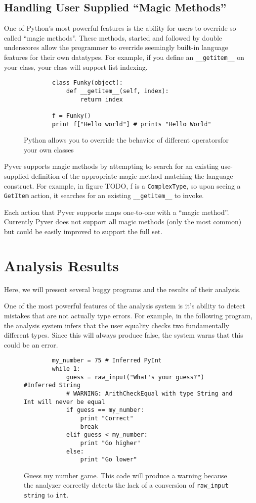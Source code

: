 \documentclass{article}[12pt]
\begin{document}
\subsection{Handling User Supplied ``Magic Methods''}
One of Python's most powerful features is the ability for users to override so called ``magic methods''. These methods,
started and followed by double underscores allow the programmer to override seemingly built-in language features for
their own datatypes. For example, if you define an \texttt{\_\_getitem\_\_} on your class, your class will support list
indexing.
\begin{figure}
    \begin{verbatim}
        class Funky(object):
            def __getitem__(self, index):
                return index

        f = Funky()
        print f["Hello world"] # prints "Hello World"
    \end{verbatim}
    \caption{Python allows you to override the behavior of different operatorsfor your own classes}
\end{figure}

Pyver supports magic methods by attempting to search for an existing use-supplied definition of the appropriate magic
method matching the language construct. For example, in figure TODO, f is a \texttt{ComplexType}, so upon seeing a
\texttt{GetItem} action, it searches for an existing \texttt{\_\_getitem\_\_} to invoke.
  
Each action that Pyver supports maps one-to-one with a ``magic method''. Currently Pyver does not support all magic
methods (only the most common) but could be easily improved to support the full set.

\section{Analysis Results}

Here, we will present several buggy programs and the results of their analysis.

One of the most powerful features of the analysis system is it's ability to detect mistakes that are
not actually type errors. For example, in the following program, the analysis system infers that the
user equality checks two fundamentally different types. Since this will always produce false, the
system warns that this could be an error.

\begin{figure}
    \begin{verbatim}
        my_number = 75 # Inferred PyInt
        while 1:
            guess = raw_input("What's your guess?") #Inferred String
            # WARNING: ArithCheckEqual with type String and Int will never be equal 
            if guess == my_number:
                print "Correct"
                break
            elif guess < my_number:
                print "Go higher"
            else:
                print "Go lower"
    \end{verbatim}
    \caption{Guess my number game. This code will produce a warning because the analyzer correctly
        detects the lack of a conversion of \texttt{raw\_input} \texttt{string} to \texttt{int}.}
\end{figure}
\end{document}
